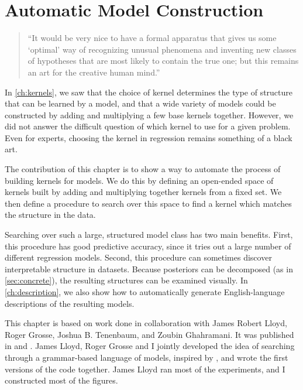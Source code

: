
\inbpdocument


\chapter{Automatic Model Construction}
\label{ch:grammar}

\begin{quotation}
``It would be very nice to have a formal apparatus that gives us some `optimal' way of recognizing unusual phenomena and inventing new classes of hypotheses that are most likely to contain the true one; but this remains an art for the creative human mind.''

\hspace*{\fill}
\end{quotation}


In \cref{ch:kernels}, we saw that the choice of kernel determines the type of structure that can be learned by a \gp{} model, and that a wide variety of models could be constructed by adding and multiplying a few base kernels together.
However, we did not answer the difficult question of which kernel to use for a given problem.
Even for experts, choosing the kernel in \gp{} regression remains something of a black art.

The contribution of this chapter is to show a way to automate the process of building kernels for \gp{} models.
We do this by defining an open-ended space of kernels built by adding and multiplying together kernels from a fixed set.
We then define a procedure to search over this space to find a kernel which matches the structure in the data.

Searching over such a large, structured model class has two main benefits.
First, this procedure has good predictive accuracy, since it tries out a large number of different regression models.
Second, this procedure can sometimes discover interpretable structure in datasets.
Because \gp{} posteriors can be decomposed (as in \cref{sec:concrete}), the resulting structures can be examined visually.
In \cref{ch:description}, we also show how to automatically generate English-language descriptions of the resulting models.


This chapter is based on work done in collaboration with James Robert Lloyd, Roger Grosse, Joshua B. Tenenbaum, and Zoubin Ghahramani.
It was published in \citet{DuvLloGroetal13} and \citet{LloDuvGroetal14}.
James Lloyd, Roger Grosse and I jointly developed the idea of searching through a grammar-based language of \gp{} models, inspired by \citet{grosse2012exploiting}, 
and wrote the first versions of the code together.
James Lloyd ran most of the experiments, and I constructed most of the figures.

